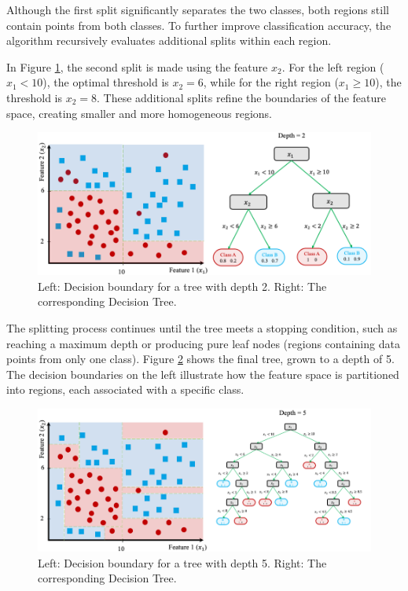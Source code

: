 \documentclass[
]{book}
\theoremstyle{definition}
\theoremstyle{definition}
\theoremstyle{definition}
\theoremstyle{definition}
\theoremstyle{remark}
\begin{document}
Although the first split significantly separates the two classes, both regions still contain points from both classes. To further improve classification accuracy, the algorithm recursively evaluates additional splits within each region.

In Figure \ref{fig:tree-3}, the second split is made using the feature \(x_2\). For the left region (\(x_1 < 10\)), the optimal threshold is \(x_2 = 6\), while for the right region (\(x_1 \geq 10\)), the threshold is \(x_2 = 8\). These additional splits refine the boundaries of the feature space, creating smaller and more homogeneous regions.

\begin{figure}

{\centering \includegraphics[width=0.9\linewidth]{images/ex_tree_3} 

}

\caption{Left: Decision boundary for a tree with depth 2. Right: The corresponding Decision Tree.}\label{fig:tree-3}
\end{figure}

The splitting process continues until the tree meets a stopping condition, such as reaching a maximum depth or producing pure leaf nodes (regions containing data points from only one class). Figure \ref{fig:tree-4} shows the final tree, grown to a depth of 5. The decision boundaries on the left illustrate how the feature space is partitioned into regions, each associated with a specific class.

\begin{figure}

{\centering \includegraphics[width=0.9\linewidth]{images/ex_tree_4} 

}

\caption{Left: Decision boundary for a tree with depth 5. Right: The corresponding Decision Tree.}\label{fig:tree-4}
\end{figure}
\end{document}
